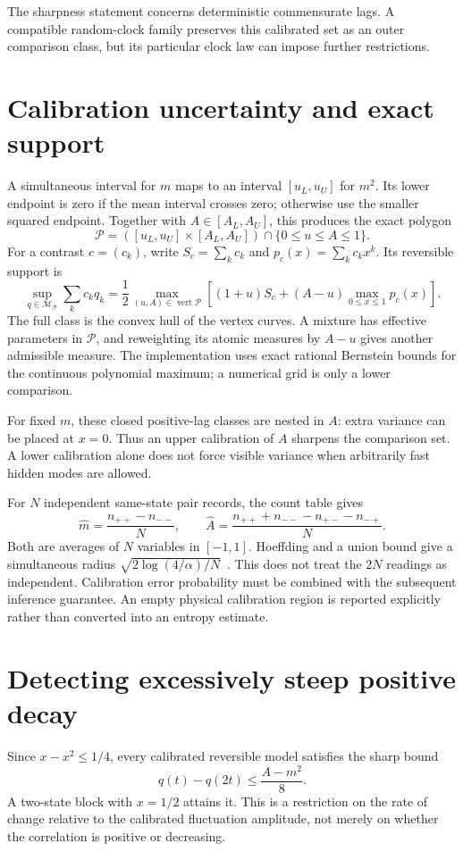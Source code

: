 The sharpness statement concerns deterministic commensurate lags. A compatible
random-clock family preserves this calibrated set as an outer comparison class,
but its particular clock law can impose further restrictions.

\section{Calibration uncertainty and exact support}
A simultaneous interval for $m$ maps to an interval $[u_L,u_U]$ for $m^2$.
Its lower endpoint is zero if the mean interval crosses zero; otherwise use the
smaller squared endpoint. Together with $A\in[A_L,A_U]$, this produces the
exact polygon
\[
 \mathcal P=([u_L,u_U]\times[A_L,A_U])\cap\{0\leq u\leq A\leq1\}.
\]
For a contrast $c=(c_k)$, write $S_c=\sum_kc_k$ and
$p_c(x)=\sum_kc_kx^k$. Its reversible support is
\begin{equation}
 \sup_{q\in\mathcal M_{\mathcal P}}\sum_kc_kq_k
 =\frac12\max_{(u,A)\in\operatorname{vert}\mathcal P}
 \left[(1+u)S_c+(A-u)\max_{0\leq x\leq1}p_c(x)\right].
 \label{eq:ci-support}
\end{equation}
The full class is the convex hull of the vertex curves. A mixture has effective
parameters in $\mathcal P$, and reweighting its atomic measures by $A-u$ gives
another admissible measure. The implementation uses exact rational Bernstein
bounds for the continuous polynomial maximum; a numerical grid is only a lower
comparison.

For fixed $m$, these closed positive-lag classes are nested in $A$: extra
variance can be placed at $x=0$. Thus an upper calibration of $A$ sharpens the
comparison set. A lower calibration alone does not force visible variance when
arbitrarily fast hidden modes are allowed.

For $N$ independent same-state pair records, the count table gives
\[
 \widehat m=\frac{n_{++}-n_{--}}N,\qquad
 \widehat A=\frac{n_{++}+n_{--}-n_{+-}-n_{-+}}N.
\]
Both are averages of $N$ variables in $[-1,1]$. Hoeffding and a union bound give
a simultaneous radius
$\sqrt{2\log(4/\alpha)/N}$~\cite{caHoeffding1963}. This does not treat the
$2N$ readings as independent. Calibration error probability must be combined
with the subsequent inference guarantee. An empty physical calibration region
is reported explicitly rather than converted into an entropy estimate.

\section{Detecting excessively steep positive decay}
Since $x-x^2\leq1/4$, every calibrated reversible model satisfies the sharp bound
\begin{equation}
 q(t)-q(2t)\leq\frac{A-m^2}{8}.
 \label{eq:ci-steep-decay}
\end{equation}
A two-state block with $x=1/2$ attains it. This is a restriction on the rate of
change relative to the calibrated fluctuation amplitude, not merely on whether
the correlation is positive or decreasing.

